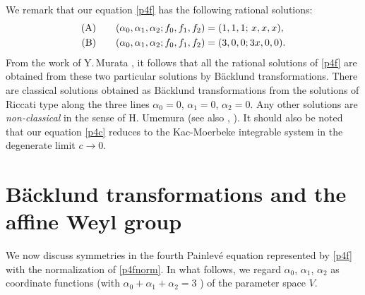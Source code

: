 \par\medskip
We remark that our equation \eqref{p4f}  
has the following rational solutions:
\begin{equation}
\begin{align} \label{ratsol}
\mbox{(A)} &\qquad(\alpha_0,\alpha_1,\alpha_2; f_0,f_1,f_2) 
= (1,1,1;\, x,x,x),  \\
\mbox{(B)} &\qquad(\alpha_0,\alpha_1,\alpha_2; f_0,f_1,f_2) 
= (3,0,0; 3x,0,0).\notag
\end{align}
\end{equation}
{}From the work of Y.\,Murata \cite{M}, it follows 
that all the rational solutions of \eqref{p4f} are obtained from 
these two particular solutions by B\"acklund transformations. 
There are classical solutions obtained as B\"acklund transformations 
from the solutions of Riccati type along the three lines $\alpha_0=0$, 
$\alpha_1=0$, $\alpha_2=0$. 
Any other solutions are {\em non-classical} in the sense of H. Umemura 
\cite{U} (see also \cite{NO}, \cite{Ok}).
It should also be noted that our equation \eqref{p4c} reduces to
the Kac-Moerbeke integrable system \cite{KM} in the degenerate limit
$c \rightarrow 0$.

\par\medskip
\section{B\"acklund transformations and the affine Weyl group}

We now discuss symmetries in  the fourth  Painlev\'e equation represented 
by \eqref{p4f} with the normalization of \eqref{p4fnorm}. 
In what follows, we regard $\alpha_0$, $\alpha_1$, $\alpha_2$ 
as coordinate functions (with  $\alpha_0+\alpha_1+\alpha_2=3$ ) 
of the parameter space $V$. 

